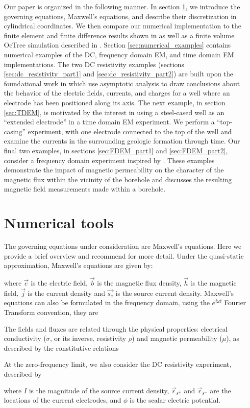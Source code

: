 Our paper is organized in the following manner. In section \ref{sec:numerical_tools}, we introduce the governing equations, Maxwell’s equations, and describe their discretization in cylindrical coordinates. We then compare our numerical implementation to the finite element and finite difference results shown in \citep{Commer2015} as well as a finite volume OcTree simulation described in \citep{Haber2007}. Section \ref{sec:numerical_examples} contains numerical examples of the DC, frequency domain EM, and time domain EM implementations. The two DC resistivity examples (sections \ref{sec:dc_resistivity_part1} and \ref{sec:dc_resistivity_part2}) are built upon the foundational work in \citep{Kaufman1990, Kaufman1993} which use asymptotic analysis to draw conclusions about the behavior of the electric fields, currents, and charges for a well where an electrode has been positioned along its axis. The next example, in section \ref{sec:TDEM}, is motivated by the interest in using a steel-cased well as an ``extended electrode'' in a time domain EM experiment. We perform a ``top-casing'' experiment, with one electrode connected to the top of the well and examine the currents in the surrounding geologic formation through time. Our final two examples, in sections \ref{sec:FDEM_part1} and \ref{sec:FDEM_part2}, consider a frequency domain experiment inspired by \citep{Augustin1989}. These examples demonstrate the impact of magnetic permeability on the character of the magnetic flux within the vicinity of the borehole and discusses the resulting magnetic field measurements made within a borehole.

\section{Numerical tools}
\label{sec:numerical_tools}

The governing equations under consideration are Maxwell's equations. Here we provide a brief overview and recommend \cite{Ward1988} for more detail. Under the quasi-static approximation, Maxwell's equations are given by:

where $\vec{e}$ is the electric field, $\vec{b}$ is the magnetic flux density, $\vec{h}$ is the magnetic field, $\vec{j}$ is the current density and $\vec{s_e}$ is the source current density. Maxwell's equations can also be formulated in the frequency domain, using the $e^{i \omega t}$ Fourier Transform convention, they are

The fields and fluxes are related through the physical properties: electrical conductivity ($\sigma$, or its inverse, resistivity $\rho$) and magnetic permeability ($\mu$), as described by the constitutive relations

At the zero-frequency limit, we also consider the DC resistivity experiment, described by

where $I$ is the magnitude of the source current density, $\vec{r}_{s^+}$ and $\vec{r}_{s^-}$ are the locations of the current electrodes, and $\phi$ is the scalar electric potential.


